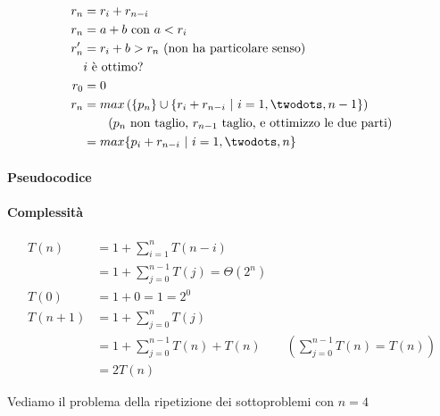 \begin{align*}
    r_n & = r_i + r_{n-i} \\
    r_n & = a + b \text{ con } a < r_i \\
    r_n' & = r_i + b > r_n \text{ (non ha particolare senso)} \\
    & i \text{ è ottimo?} \\
    r_0 & = 0 \\
    r_n & = max \left( \{ p_n \} \cup \{ r_i + r_{n-i} \ | \ i = 1 , \twodots, n-1 \} \right) \\
    & \qquad \text{($p_n$ non taglio, $r_{n-1}$ taglio, e ottimizzo le due parti)} \\
    & = max\{ p_i + r_{n-i} \ | \ i=1, \twodots, n \}
\end{align*}

\clearpage

\paragraph{Pseudocodice}


\paragraph{Complessità}
\begin{align*}
    T(n) & = 1 + \displaystyle\sum_{i=1}^n T(n-i) \\
    & = 1 + \displaystyle\sum_{j=0}^{n-1} T(j) = \Theta(2^n) \\
    T(0) & = 1 + 0 = 1 = 2^0 \\
    T(n+1) & = 1 + \displaystyle\sum_{j=0}^n T(j) \\
    & = 1 + \displaystyle\sum_{j=0}^{n-1} T(n) + T(n) \qquad
    \left( \displaystyle\sum_{j=0}^{n-1} T(n) = T(n) \right) \\
    & = 2 T(n)
\end{align*}

\clearpage

Vediamo il problema della ripetizione dei sottoproblemi con $n = 4$
\begin{center}
\end{center}

